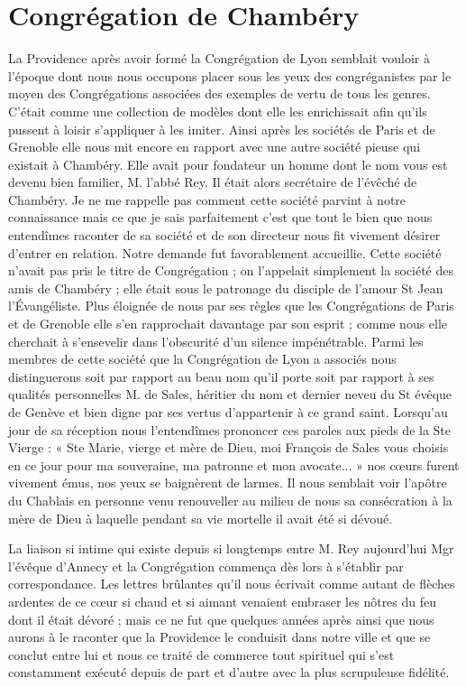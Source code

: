 \section*{Congrégation de Chambéry}
La Providence après avoir formé la Congrégation de Lyon semblait vouloir à l'époque dont nous nous occupons placer sous les yeux des congréganistes par le moyen des Congrégations associées des exemples de vertu de tous les genres. C'était comme une collection de modèles dont elle les enrichissait afin qu'ils pussent à loisir s'appliquer à les imiter. Ainsi après les sociétés de Paris et de Grenoble elle nous mit encore en rapport avec une autre société pieuse qui existait à Chambéry. Elle avait pour fondateur un homme dont le nom vous est devenu bien familier, M. l'abbé Rey. Il était alors secrétaire de l'évêché de Chambéry. Je ne me rappelle pas comment cette société parvint à notre connaissance mais ce que je sais parfaitement c'est que tout le bien que nous entendîmes raconter de sa société et de son directeur nous fit vivement désirer d'entrer en relation. Notre demande fut favorablement accueillie. Cette société n'avait pas pris le titre de Congrégation ; on l'appelait simplement la société des amis de Chambéry ; elle était sous le patronage du disciple de l'amour St Jean
l'Évangéliste. Plus éloignée de nous par ses règles que les Congrégations de Paris et de Grenoble elle s'en rapprochait davantage par son esprit ; comme nous elle cherchait à s'ensevelir dans l'obscurité d'un silence impénétrable. Parmi les membres de cette société que la Congrégation de Lyon a associés nous distinguerons soit par rapport au beau nom qu'il porte soit par rapport à ses qualités personnelles M. de Sales, héritier du nom et dernier neveu du St évêque de Genève et bien digne par ses vertus d'appartenir à ce grand saint. Lorsqu'au jour de sa réception nous l'entendîmes prononcer ces paroles aux pieds de la Ste Vierge : « Ste Marie, vierge et mère de Dieu, moi François de Sales vous choisis en ce jour pour ma souveraine, ma patronne et mon avocate... » nos cœurs furent vivement émus, nos yeux se baignèrent de larmes. Il nous semblait voir l'apôtre du Chablais en personne venu renouveller au milieu de nous sa consécration à la mère de Dieu à laquelle pendant sa vie mortelle il avait été si dévoué.

La liaison si intime qui existe depuis si longtemps entre M. Rey aujourd'hui Mgr l'évêque d'Annecy et la Congrégation commença dès lors à s'établir par correspondance. Les lettres brûlantes qu'il nous écrivait comme autant de flèches ardentes de ce cœur si chaud et si aimant venaient embraser les nôtres du feu dont il était dévoré ; mais ce ne fut que quelques années après ainsi que nous aurons à le raconter que la Providence le conduisit dans notre ville et que se conclut entre lui et nous ce traité de commerce tout spirituel qui s'est constamment exécuté depuis de part et d'autre avec la plus scrupuleuse fidélité.

